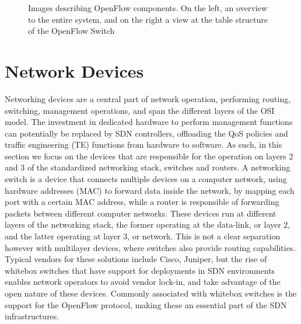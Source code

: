 \begin {enumerate}
\begin{figure} [h]
    \centering
    \begin{subfigure}
    \texttt{[image: sdn/open\_flow\_switch\_pipeline]}
    \end{subfigure}
    \begin{subfigure}
    \texttt{[image: sdn/open\_flow\_tables]}
    \end{subfigure}
    \caption{Images describing OpenFlow components. On the left, an overview to the entire system, and on the right a view at the table structure of the OpenFlow Switch}
\end{figure}

\section {Network Devices}

Networking devices are a central part of network operation, performing routing, switching, management operations, and span the different layers of the OSI model. The investment in dedicated hardware to perform management functions can
potentially be replaced by SDN controllers, offloading the QoS policies and traffic engineering (TE) functions from hardware to software. As such, in this section we focus on the devices that are responsible for the operation on 
layers 2 and 3 of the standardized networking stack, switches and routers. A networking switch is a device that connects multiple devices on a computer network, using hardware addresses (MAC) to forward data inside the network, 
by mapping each port with a certain MAC address, while a router is responsible of forwarding packets between different computer networks. These devices run at different layers of the networking stack, the former operating at the 
data-link, or layer 2, and the latter operating at layer 3, or network. This is not a clear separation however with multilayer devices, where switches also provide routing capabilities. Typical vendors for these solutions include
Cisco, Juniper, but the rise of whitebox switches that have support for deployments in SDN environments enables network operators to avoid vendor lock-in, and take advantage of the open nature of these devices. Commonly associated 
with whitebox switches is the support for the OpenFlow protocol, making these an essential part of the SDN infrastructures.


\end{enumerate}
